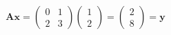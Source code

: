 \documentclass[12pt]{scrartcl}
\renewcommand{\vec}[1]{\boldsymbol{#1}}
\begin{document}
\[
\boldsymbol{A}\vec{x} =
\begin{pmatrix}
0 & 1\\
2 & 3
\end{pmatrix}
\begin{pmatrix}
1\\
2
\end{pmatrix}
=
\begin{pmatrix}
2\\
8
\end{pmatrix}
= \vec{y}
\]
\end{document}
